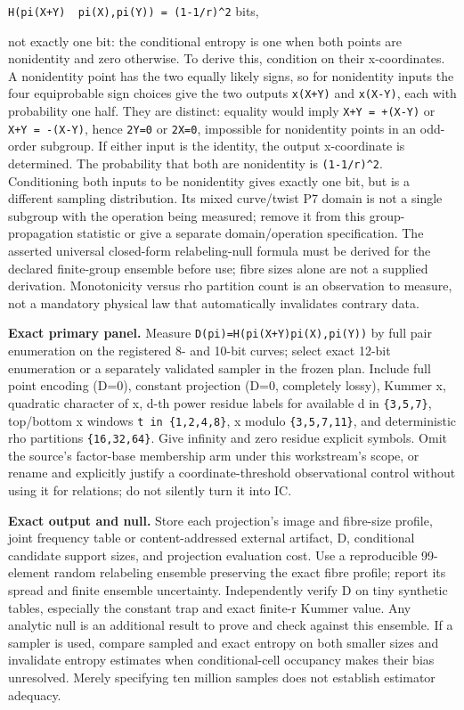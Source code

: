 \documentclass[
  10pt,
]{article}
\begin{document}
\texttt{H(pi(X+Y)\ \textbar{}\ pi(X),pi(Y))\ =\ (1-1/r)\^{}2} bits,

not exactly one bit: the conditional entropy is one when both points are
nonidentity and zero otherwise. To derive this, condition on their
x-coordinates. A nonidentity point has the two equally likely signs, so
for nonidentity inputs the four equiprobable sign choices give the two
outputs \texttt{x(X+Y)} and \texttt{x(X-Y)}, each with probability one
half. They are distinct: equality would imply \texttt{X+Y\ =\ +(X-Y)} or
\texttt{X+Y\ =\ -(X-Y)}, hence \texttt{2Y=0} or \texttt{2X=0},
impossible for nonidentity points in an odd-order subgroup. If either
input is the identity, the output x-coordinate is determined. The
probability that both are nonidentity is \texttt{(1-1/r)\^{}2}.
Conditioning both inputs to be nonidentity gives exactly one bit, but is
a different sampling distribution. Its mixed curve/twist P7 domain is
not a single subgroup with the operation being measured; remove it from
this group-propagation statistic or give a separate domain/operation
specification. The asserted universal closed-form relabeling-null
formula must be derived for the declared finite-group ensemble before
use; fibre sizes alone are not a supplied derivation. Monotonicity
versus rho partition count is an observation to measure, not a mandatory
physical law that automatically invalidates contrary data.

\textbf{Exact primary panel.} Measure
\texttt{D(pi)=H(pi(X+Y)\textbar{}pi(X),pi(Y))} by full pair enumeration
on the registered 8- and 10-bit curves; select exact 12-bit enumeration
or a separately validated sampler in the frozen plan. Include full point
encoding (D=0), constant projection (D=0, completely lossy), Kummer x,
quadratic character of x, d-th power residue labels for available d in
\texttt{\{3,5,7\}}, top/bottom x windows \texttt{t\ in\ \{1,2,4,8\}}, x
modulo \texttt{\{3,5,7,11\}}, and deterministic rho partitions
\texttt{\{16,32,64\}}. Give infinity and zero residue explicit symbols.
Omit the source's factor-base membership arm under this workstream's
scope, or rename and explicitly justify a coordinate-threshold
observational control without using it for relations; do not silently
turn it into IC.

\textbf{Exact output and null.} Store each projection's image and
fibre-size profile, joint frequency table or content-addressed external
artifact, D, conditional candidate support sizes, and projection
evaluation cost. Use a reproducible 99-element random relabeling
ensemble preserving the exact fibre profile; report its spread and
finite ensemble uncertainty. Independently verify D on tiny synthetic
tables, especially the constant trap and exact finite-r Kummer value.
Any analytic null is an additional result to prove and check against
this ensemble. If a sampler is used, compare sampled and exact entropy
on both smaller sizes and invalidate entropy estimates when
conditional-cell occupancy makes their bias unresolved. Merely
specifying ten million samples does not establish estimator adequacy.
\end{document}
